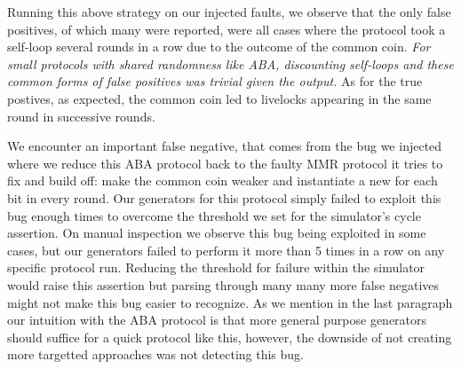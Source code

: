 
Running this above strategy on our injected faults, we observe that the only
false positives, of which many were reported, were all cases where the protocol
took a self-loop several rounds in a row due to the outcome of the common coin.
\emph{For small protocols with shared randomness like ABA, discounting
self-loops and these common forms of false positives was trivial given the
output.} As for the true postives, as expected, the common coin led to livelocks
appearing in the same round in successive rounds.  

We encounter an important false negative, that comes from the bug we injected
where we reduce this ABA protocol back to the faulty MMR protocol it tries to
fix and build off: make the common coin weaker and instantiate a new 
for each bit in every round.  Our generators for this protocol simply failed to
exploit this bug enough times to overcome the threshold we set for the
simulator's cycle assertion.  On manual inspection we observe this bug being
exploited in some cases, but our generators failed to perform it more than 5
times in a row on any specific protocol run.  Reducing the threshold for
failure within the simulator would raise this assertion but parsing through
many many more false negatives might not make this bug easier to recognize.  As
we mention in the last paragraph our intuition with the ABA protocol is that
more general purpose generators should suffice for a quick protocol like this,
however, the downside of not creating more targetted approaches was not
detecting this bug.

